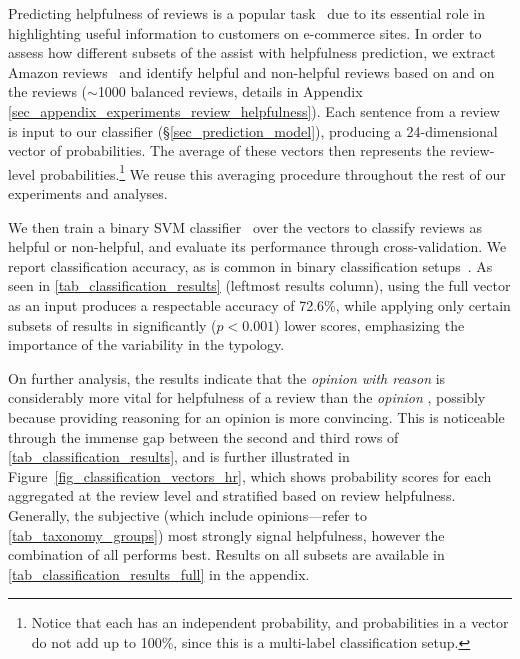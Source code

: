 Predicting helpfulness of reviews is a popular task~\citep{ocampodiaz2018helpfulnessFeatures} due to its essential role in highlighting useful information to customers on e-commerce sites.
In order to assess how different subsets of the \taxtypes{} assist with helpfulness prediction, we extract Amazon reviews~\citep{he2016reviewsDS} and identify helpful and non-helpful reviews based on  and  on the reviews ($\sim$1000 balanced reviews, details in Appendix \ref{sec_appendix_experiments_review_helpfulness}).
Each sentence from a review
is input to our classifier (\S\ref{sec_prediction_model}), producing a 24-dimensional vector of \taxtype{} probabilities.
The average of these vectors then represents the review-level \taxtype{} probabilities.\footnote{Notice that each \taxtype{} has an independent probability, and probabilities in a vector do not add up to 100\%, since this is a multi-label classification setup.}
We reuse this averaging procedure throughout the rest of our experiments and analyses.

We then train a binary SVM classifier~\citep{Cortes1995svm} over the vectors to classify reviews as helpful or non-helpful, and evaluate its performance through cross-validation. We report classification accuracy, as is common in binary classification setups~\citep{Yadav2020sentAna}.
As seen in \autoref{tab_classification_results} (leftmost results column), using the full \taxtypes{} vector as an input produces a respectable accuracy of 72.6\%, while applying only certain subsets of \taxtypes{} results in significantly ($p<0.001$) lower scores, emphasizing the importance of the variability in the typology.

On further analysis, the results indicate that the \textit{opinion with reason} \taxtype{} is considerably more vital for helpfulness of a review than the \textit{opinion} \taxtype{}, possibly because providing reasoning for an opinion is more convincing.
This is noticeable through the immense gap between the second and third rows of \autoref{tab_classification_results}, and is further illustrated in Figure~\ref{fig_classification_vectors_hr}, which shows probability scores for each \taxtype{} aggregated at the review level and stratified based on review helpfulness.
Generally, the subjective \taxtypes{} (which include opinions---refer to \autoref{tab_taxonomy_groups}) most strongly signal helpfulness, however the combination of all \taxtypes{} performs best.
Results on all \taxtype{} subsets are available in \autoref{tab_classification_results_full} in the appendix.

